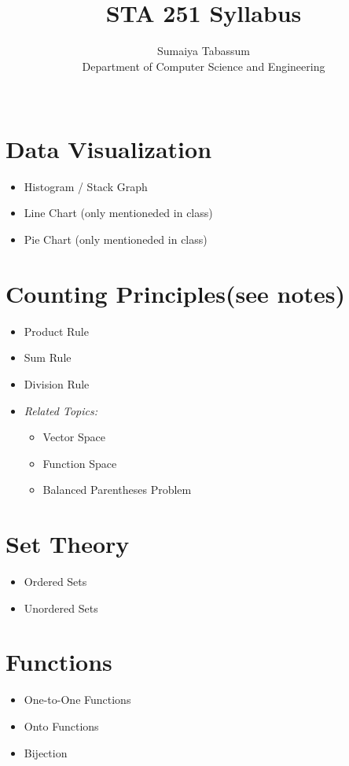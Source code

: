 \documentclass[11pt]{article}
\title{STA 251 Syllabus \\}
\author{Sumaiya Tabassum\\
 Department of Computer Science and Engineering\\
 \affaddr{University of Chittagong, Chittagong, Bangladesh}\\
}
\begin{document}
\maketitle
\pagestyle{plain}

\section{Data Visualization}
\begin{itemize}
\item Histogram / Stack Graph
\item Line Chart (only mentioneded in class)
\item Pie Chart (only mentioneded in class)
\end{itemize}

\section{Counting Principles(see notes)}
\begin{itemize}
\item Product Rule
\item Sum Rule
\item Division Rule
\item \emph{Related Topics:}
\begin{itemize}
\item Vector Space
\item Function Space
\item Balanced Parentheses Problem
\end{itemize}
\end{itemize}

\section{Set Theory}
\begin{itemize}
\item Ordered Sets
\item Unordered Sets
\end{itemize}

\section{Functions}
\begin{itemize}
\item One-to-One Functions
\item Onto Functions
\item Bijection
\end{itemize}
\end{document}
